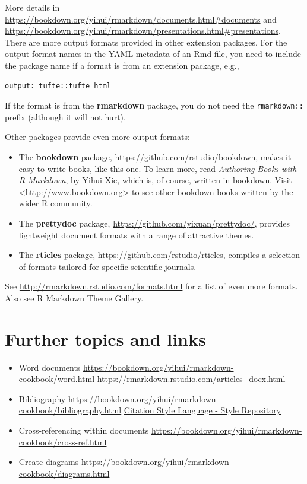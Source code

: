 \documentclass[
]{book}
\providecommand{\tightlist}{%
  \setlength{\itemsep}{0pt}\setlength{\parskip}{0pt}}
\begin{document}
More details in \url{https://bookdown.org/yihui/rmarkdown/documents.html\#documents} and \url{https://bookdown.org/yihui/rmarkdown/presentations.html\#presentations}. There are more output formats provided in other extension packages. For the output format names in the YAML metadata of an Rmd file, you need to include the package name if a format is from an extension package, e.g.,

\begin{verbatim}
output: tufte::tufte_html
\end{verbatim}

If the format is from the \textbf{rmarkdown} package, you do not need the \texttt{rmarkdown::} prefix (although it will not hurt).

Other packages provide even more output formats:

\begin{itemize}
\item
  The \textbf{bookdown} package, \url{https://github.com/rstudio/bookdown}, makes it easy to write books, like this one. To learn more, read \href{https://bookdown.org/yihui/bookdown/}{\emph{Authoring Books with R Markdown}}, by Yihui Xie, which is, of course, written in bookdown. Visit \href{http://www.bookdown.org/}{\textless http://www.bookdown.org\textgreater{}} to see other bookdown books written by the wider R community.
\item
  The \textbf{prettydoc} package, \url{https://github.com/yixuan/prettydoc/}, provides lightweight document formats with a range of attractive themes.
\item
  The \textbf{rticles} package, \url{https://github.com/rstudio/rticles}, compiles a selection of formats tailored for specific scientific journals.
\end{itemize}

See \url{http://rmarkdown.rstudio.com/formats.html} for a list of even more formats. Also see \href{https://www.datadreaming.org/post/r-markdown-theme-gallery/}{R Markdown Theme Gallery}.

\hypertarget{further-topics-and-links}{%
\section{Further topics and links}\label{further-topics-and-links}}

\begin{itemize}
\tightlist
\item
  Word documents
  \url{https://bookdown.org/yihui/rmarkdown-cookbook/word.html}
  \url{https://rmarkdown.rstudio.com/articles_docx.html}
\item
  Bibliography
  \url{https://bookdown.org/yihui/rmarkdown-cookbook/bibliography.html}
  \href{https://github.com/citation-style-language/styles}{Citation Style Language - Style Repository}
\item
  Cross-referencing within documents
  \url{https://bookdown.org/yihui/rmarkdown-cookbook/cross-ref.html}
\item
  Create diagrams
  \url{https://bookdown.org/yihui/rmarkdown-cookbook/diagrams.html}
\end{itemize}
\end{document}
